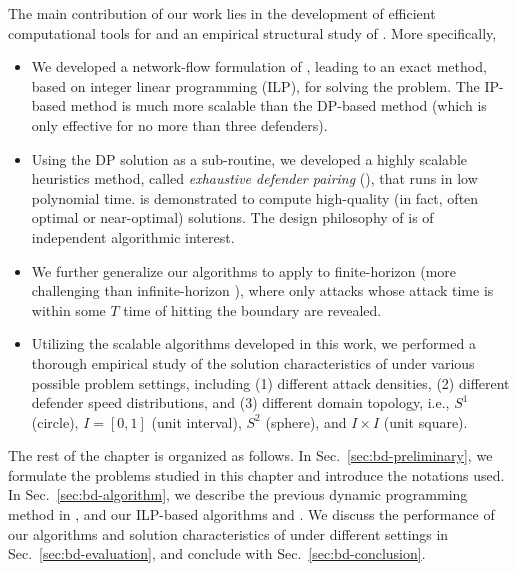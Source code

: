 The main contribution of our work lies in the development of efficient computational tools for and an empirical structural study of \prob. More specifically, 
\begin{itemize}[leftmargin=3.5mm]
\item We developed a network-flow formulation of \prob, leading to an exact method, based on integer linear programming (ILP), for solving the problem. The IP-based method is much more scalable than the DP-based method (which is only effective for no more than three defenders). 
\item Using the DP solution as a sub-routine, we developed a highly scalable heuristics method, called \emph{exhaustive defender pairing} (\ours), that runs in low polynomial time.  \ours is demonstrated to compute high-quality (in fact, often optimal or near-optimal) solutions. The design philosophy of \ours is of independent algorithmic interest. 
\item We further generalize our algorithms to apply to finite-horizon \prob (more challenging than infinite-horizon \prob), where only attacks whose attack time is within some $T$ time of hitting the boundary are revealed.
\item Utilizing the scalable algorithms developed in this work, we performed a thorough empirical study of the solution characteristics of \prob under various possible problem settings, including (1) different attack densities, (2) different defender speed distributions, and (3) different domain topology, i.e., $S^1$ (circle), $I = [0, 1]$ (unit interval), $S^2$ (sphere), and $I \times I$ (unit square). 
\end{itemize}


The rest of the chapter is organized as follows. 
In Sec.~\ref{sec:bd-preliminary}, we formulate the problems studied in this chapter and introduce the notations used. 
In Sec.~\ref{sec:bd-algorithm}, we describe the previous dynamic programming method in \cite{adler2022role}, 
and our ILP-based algorithms and \ours. 
We discuss the performance of our algorithms and solution characteristics of \prob under different settings in 
Sec.~\ref{sec:bd-evaluation}, 
and conclude with Sec.~\ref{sec:bd-conclusion}.


